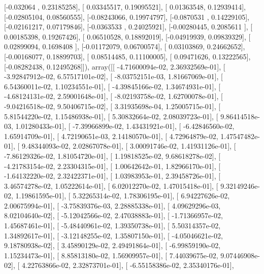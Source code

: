 \documentclass{article}
\begin{document}
       [-0.032064  ,  0.23185258],
       [ 0.03345517,  0.19095521],
       [ 0.01363548,  0.12939414],
       [-0.02805104,  0.08560555],
       [-0.08243066,  0.19974797],
       [-0.0870531 ,  0.14229105],
       [-0.02161217,  0.07179846],
       [-0.0363533 ,  0.24025921],
       [-0.00280445,  0.2085611 ],
       [ 0.00185398,  0.19267426],
       [ 0.06510528,  0.18892019],
       [-0.04919939,  0.09839329],
       [ 0.02899094,  0.1698408 ],
       [-0.01172079,  0.06700574],
       [ 0.03103869,  0.24662652],
       [-0.00168077,  0.18899703],
       [ 0.08514485,  0.11100005],
       [ 0.09471626,  0.13222565],
       [-0.08282438,  0.12495268]]), array([[ -4.71600094e-02,   2.36932569e-01],
       [ -3.92847912e-02,   6.57517101e-02],
       [ -8.03752151e-03,   1.81667069e-01],
       [  6.54360011e-02,   1.10234551e-01],
       [ -4.39845166e-02,   1.34674931e-01],
       [ -4.68124131e-02,   2.59001648e-01],
       [ -8.02193758e-02,   1.62700078e-01],
       [ -9.04216518e-02,   9.50406715e-02],
       [  3.31935698e-04,   1.25005715e-01],
       [  5.81544220e-02,   1.15486938e-01],
       [  5.30832664e-02,   2.08039723e-01],
       [  9.86414518e-03,   1.01280433e-01],
       [ -7.39966899e-02,   1.43431921e-01],
       [ -6.42846560e-02,   1.65914709e-01],
       [  4.72190651e-03,   2.14180570e-01],
       [  4.72964879e-02,   1.47547482e-01],
       [  9.48344093e-02,   2.02867078e-01],
       [  3.00091746e-02,   1.41931126e-01],
       [ -7.86129326e-02,   1.81054720e-01],
       [  1.19818525e-02,   9.68618278e-02],
       [ -4.21783154e-02,   2.23304315e-01],
       [  1.00642642e-01,   1.82966170e-01],
       [ -1.64132220e-02,   2.32422371e-01],
       [  1.03983953e-01,   2.39458726e-01],
       [  3.46574278e-02,   1.05222614e-01],
       [  6.02012270e-02,   1.47015418e-01],
       [  9.32149246e-02,   1.19861595e-01],
       [  5.32265314e-02,   1.78306195e-01],
       [  6.94227626e-02,   2.00675994e-01],
       [ -3.75839376e-03,   2.28885338e-01],
       [  4.09629296e-03,   8.02104640e-02],
       [ -5.12042566e-02,   2.47038883e-01],
       [ -1.71366957e-02,   1.45687461e-01],
       [ -5.48440961e-02,   1.39350738e-01],
       [  5.50314357e-02,   1.34892617e-01],
       [ -3.12148255e-02,   1.35807150e-01],
       [ -4.05046621e-02,   9.18780938e-02],
       [  3.45890129e-02,   2.49491864e-01],
       [ -6.99859190e-02,   1.15234473e-01],
       [  8.85813180e-02,   1.56909957e-01],
       [  7.44039675e-02,   9.07446908e-02],
       [  4.22763866e-02,   2.32873701e-01],
       [ -6.55158386e-02,   2.35340176e-01],
\end{document}
